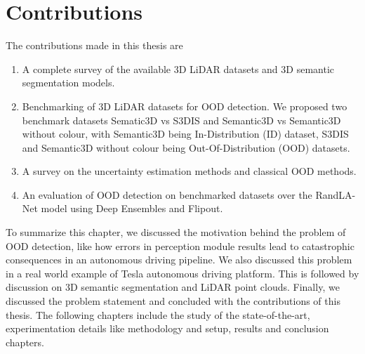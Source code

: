 \section{Contributions}
The contributions made in this thesis are
\begin{enumerate}
    \item A complete survey of the available 3D LiDAR datasets and 3D semantic segmentation models.
    \item Benchmarking of 3D LiDAR datasets for OOD detection. We proposed two benchmark datasets Sematic3D vs S3DIS and Semantic3D vs Semantic3D without colour, with Semantic3D being In-Distribution (ID) dataset, S3DIS and Semantic3D without colour being Out-Of-Distribution (OOD) datasets.
    \item A survey on the uncertainty estimation methods and classical OOD methods.
    \item An evaluation of OOD detection on benchmarked datasets over the RandLA-Net model using Deep Ensembles and Flipout.
\end{enumerate}

To summarize this chapter, we discussed the motivation behind the problem of OOD detection, like
how errors in perception module results lead to catastrophic consequences in an autonomous driving pipeline.
We also discussed this problem in a real world example of Tesla autonomous driving platform.
This is followed by discussion on 3D semantic segmentation and LiDAR point clouds.
Finally, we discussed the problem statement and concluded with the contributions of this thesis.
The following chapters include the study of the state-of-the-art, experimentation details like methodology and setup, results and conclusion chapters.




